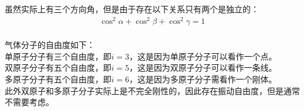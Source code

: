 \documentclass[UTF8]{ctexart}
\begin{document}
    虽然实际上有三个方向角，但是由于存在以下关系只有两个是独立的：
    \setcounter{equation}{0}
    \begin{align}
        \cos^2{\alpha}+\cos^2{\beta}+\cos^2{\gamma}=1
    \end{align}\\
    气体分子的自由度如下：\\[3mm]
    单原子分子有三个自由度，即$i=3$，这是因为单原子分子可以看作一个点。\\[3mm]
    双原子分子有五个自由度，即$i=5$，这是因为双原子分子可以看作一条线。\\[3mm]
    多原子分子有五个自由度，即$i=6$，这是因为多原子分子需看作一个刚体。\\[3mm]
    此外双原子和多原子分子实际上是不完全刚性的，因此存在振动自由度，但是通常不需要考虑。

\newpage
\end{document}
